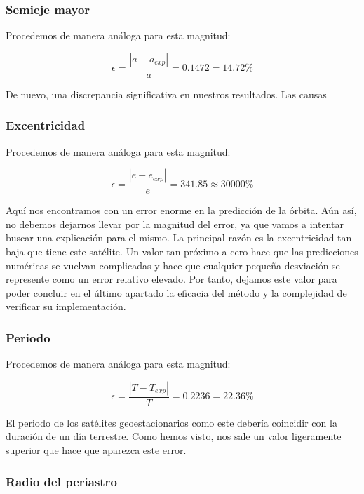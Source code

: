 \documentclass{article}
\numberwithin{equation}{section}
\begin{document}
\subsubsection{Semieje mayor}
Procedemos de manera análoga para esta magnitud:

\begin{equation*}
    \epsilon=\frac{\left\lvert a-a_{exp} \right\rvert}{a}=0.1472=14.72\%
\end{equation*}

De nuevo, una discrepancia significativa en nuestros resultados. Las causas 

\subsubsection{Excentricidad}
Procedemos de manera análoga para esta magnitud:

\begin{equation*}
    \epsilon=\frac{\left\lvert e-e_{exp} \right\rvert}{e}=341.85\approx30000\%
\end{equation*}

Aquí nos encontramos con un error enorme en la predicción de la órbita. Aún así, no debemos dejarnos llevar por la magnitud del error, ya que vamos a intentar buscar una explicación para el mismo. La principal razón es la excentricidad tan baja que tiene este satélite. Un valor tan próximo a cero hace que las predicciones numéricas se vuelvan complicadas y hace que cualquier pequeña desviación se represente como un error relativo elevado. Por tanto, dejamos este valor para poder concluir en el último apartado la eficacia del método y la complejidad de verificar su implementación.

\subsubsection{Periodo}
Procedemos de manera análoga para esta magnitud:

\begin{equation*}
    \epsilon=\frac{\left\lvert T-T_{exp} \right\rvert}{T}=0.2236=22.36\%
\end{equation*}

El periodo de los satélites geoestacionarios como este debería coincidir con la duración de un día terrestre. Como hemos visto, nos sale un valor ligeramente superior que hace que aparezca este error.

\subsubsection{Radio del periastro}
\end{document}
